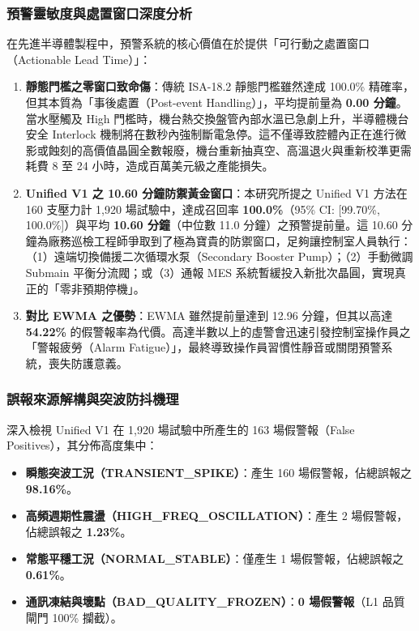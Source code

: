 \documentclass[fontset=none, a4paper, 12pt]{ctexart}
\begin{document}
\begin{doublespace}
\subsubsection{預警靈敏度與處置窗口深度分析}
在先進半導體製程中，預警系統的核心價值在於提供「可行動之處置窗口（Actionable Lead Time）」：
\begin{enumerate}
    \item \textbf{靜態門檻之零窗口致命傷}：傳統 ISA-18.2 靜態門檻雖然達成 100.0\% 精確率，但其本質為「事後處置（Post-event Handling）」，平均提前量為 \textbf{0.00 分鐘}。當水壓觸及 High 門檻時，機台熱交換盤管內部水溫已急劇上升，半導體機台安全 Interlock 機制將在數秒內強制斷電急停。這不僅導致腔體內正在進行微影或蝕刻的高價值晶圓全數報廢，機台重新抽真空、高溫退火與重新校準更需耗費 8 至 24 小時，造成百萬美元級之產能損失。
    \item \textbf{Unified V1 之 10.60 分鐘防禦黃金窗口}：本研究所提之 Unified V1 方法在 160 支壓力計 1,920 場試驗中，達成召回率 \textbf{100.0\%}（95\% CI: [99.70\%, 100.0\%]）與平均 \textbf{10.60 分鐘}（中位數 11.0 分鐘）之預警提前量。這 10.60 分鐘為廠務巡檢工程師爭取到了極為寶貴的防禦窗口，足夠讓控制室人員執行：（1）遠端切換備援二次循環水泵（Secondary Booster Pump）；（2）手動微調 Submain 平衡分流閥；或（3）通報 MES 系統暫緩投入新批次晶圓，實現真正的「零非預期停機」。
    \item \textbf{對比 EWMA 之優勢}：EWMA 雖然提前量達到 12.96 分鐘，但其以高達 \textbf{54.22\%} 的假警報率為代價。高達半數以上的虛警會迅速引發控制室操作員之「警報疲勞（Alarm Fatigue）」，最終導致操作員習慣性靜音或關閉預警系統，喪失防護意義。
\end{enumerate}

\subsubsection{誤報來源解構與突波防抖機理}
深入檢視 Unified V1 在 1,920 場試驗中所產生的 163 場假警報（False Positives），其分佈高度集中：
\begin{itemize}
    \item \textbf{瞬態突波工況（TRANSIENT\_SPIKE）}：產生 160 場假警報，佔總誤報之 \textbf{98.16\%}。
    \item \textbf{高頻週期性震盪（HIGH\_FREQ\_OSCILLATION）}：產生 2 場假警報，佔總誤報之 \textbf{1.23\%}。
    \item \textbf{常態平穩工況（NORMAL\_STABLE）}：僅產生 1 場假警報，佔總誤報之 \textbf{0.61\%}。
    \item \textbf{通訊凍結與壞點（BAD\_QUALITY\_FROZEN）}：\textbf{0 場假警報}（L1 品質閘門 100\% 攔截）。
\end{itemize}


\end{doublespace}
\end{document}
